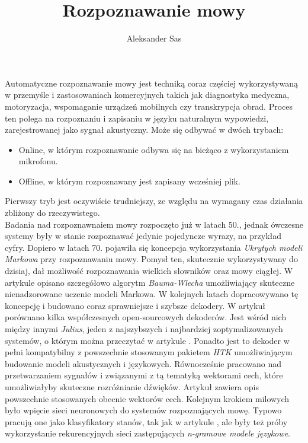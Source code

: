 \documentclass[a4paper,11pt,onecolumn,twoside,openright,titlepage]{article}
\author{Aleksander Sas}
\title{Rozpoznawanie mowy}
\begin{document}
	
	\maketitle
	\newpage
	
	Automatyczne rozpoznawanie mowy jest techniką coraz częściej wykorzystywaną w przemyśle i zastosowaniach komercyjnych takich jak diagnostyka medyczna, motoryzacja, wspomaganie urządzeń mobilnych czy transkrypcja obrad. Proces ten polega na rozpoznaniu i zapisaniu w języku naturalnym wypowiedzi, zarejestrowanej jako sygnał akustyczny. Może się odbywać w dwóch trybach:
	\begin{itemize}
		\item Online, w którym rozpoznawanie odbywa się na bieżąco z wykorzystaniem mikrofonu.
		\item Offline, w którym rozpoznawany jest zapisany wcześniej plik.
	\end{itemize}
	Pierwszy tryb jest oczywiście trudniejszy, ze względu na wymagany czas działania zbliżony do rzeczywistego. 
	\\
	Badania nad rozpoznawnaiem mowy rozpoczęto już w latach 50., jednak ówczesne systemy były w stanie rozpoznawać jedynie pojedyncze wyrazy, na przykład cyfry. Dopiero w latach 70. pojawiła się koncepcja wykorzystania \textit{Ukrytych modeli Markowa} przy rozpoznawaniu mowy. Pomysł ten, skutecznie wykorzystywany do dzisiaj, dał możliwość rozpoznawania wielkich słowników oraz mowy ciągłej. W artykule \cite{BaumWelch_tutorial} opisano szczegółowo algorytm \textit{Bauma-Wlecha} umożliwiający skuteczne nienadzorowane uczenie modeli Markowa. W kolejnych latach dopracowywano tę koncepcję i budowano coraz sprawniejsze i szybsze dekodery. W artykuł \cite{asr_toolkit_cmp} porównano kilka współczesnych open-sourcowych dekoderów. Jest wśród nich między innymi \textit{Julius}, jeden z najszybszych i najbardziej zoptymalizowanych systemów, o którym można przeczytać w artykule \cite{julius}. Ponadto jest to dekoder w pełni kompatybilny z powszechnie stosowanym pakietem \textit{HTK}\cite{juliusbook} umożliwiającym budowanie modeli akustycznych i językowych. Równocześnie pracowano nad przetwarzaniem sygnałów i związanymi z tą tematyką wektorami cech, które umożliwiałyby skuteczne rozróżnianie dźwięków. Artykuł \cite{feature_comparision} zawiera opis powszechnie stosowanych obecnie wektorów cech. Kolejnym krokiem milowych było wpięcie sieci neuronowych do systemów rozpoznających mowę. Typowo pracują one jako klasyfikatory stanów, tak jak w artykule \cite{article1}, ale były też próby wykorzystanie rekurencyjnych sieci zastępujących \textit{n-gramowe modele językowe}.
	
\end{document}
